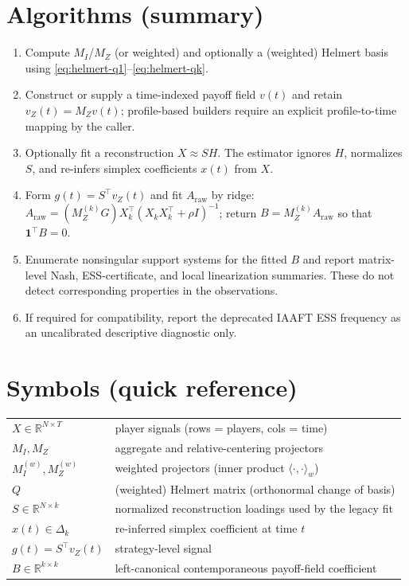 \documentclass[11pt]{article}
\newcommand{\one}{\mathbf{1}}
\newcommand{\R}{\mathbb{R}}
\begin{document}
\section{Algorithms (summary)}
\begin{enumerate}[leftmargin=*]
\item Compute $M_I$/$M_Z$ (or weighted) and optionally a (weighted) Helmert basis using \eqref{eq:helmert-q1}–\eqref{eq:helmert-qk}.
\item Construct or supply a time-indexed payoff field $v(t)$ and retain $v_Z(t)=M_Zv(t)$; profile-based builders require an explicit profile-to-time mapping by the caller.
\item Optionally fit a reconstruction $X\approx SH$. The estimator ignores $H$, normalizes $S$, and re-infers simplex coefficients $x(t)$ from $X$.
\item Form $g(t)=S^\top v_Z(t)$ and fit $A_{\mathrm{raw}}$ by ridge: $A_{\mathrm{raw}}=(M_Z^{(k)}G)X_k^\top(X_kX_k^\top+\rho I)^{-1}$; return $B=M_Z^{(k)}A_{\mathrm{raw}}$ so that $\one^\top B=0$.
\item Enumerate nonsingular support systems for the fitted $B$ and report matrix-level Nash, ESS-certificate, and local linearization summaries. These do not detect corresponding properties in the observations.
\item If required for compatibility, report the deprecated IAAFT ESS frequency as an uncalibrated descriptive diagnostic only.
\end{enumerate}

\section{Symbols (quick reference)}
\begin{center}
\begin{tabular}{ll}
$X\in\R^{N\times T}$ & player signals (rows = players, cols = time) \\
$M_I, M_Z$ & aggregate and relative-centering projectors \\
$M_I^{(w)}, M_Z^{(w)}$ & weighted projectors (inner product $\langle\cdot,\cdot\rangle_w$) \\
$Q$ & (weighted) Helmert matrix (orthonormal change of basis) \\
$S\in\R^{N\times k}$ & normalized reconstruction loadings used by the legacy fit \\
$x(t)\in\Delta_k$ & re-inferred simplex coefficient at time $t$ \\
$g(t)=S^\top v_Z(t)$ & strategy-level signal \\
$B\in\R^{k\times k}$ & left-canonical contemporaneous payoff-field coefficient \\
\end{tabular}
\end{center}
\end{document}
